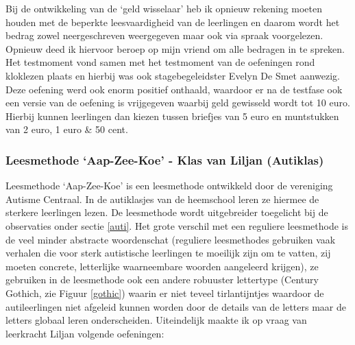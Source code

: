 \documentclass[a4paper,11pt]{article}
\theoremstyle{definition}
\begin{document}
\begin{itemize}
\begin{itemize}
\noindent Bij de ontwikkeling van de `geld wisselaar' heb ik opnieuw rekening 
moeten houden met de beperkte leesvaardigheid van de leerlingen en daarom wordt 
het bedrag zowel neergeschreven weergegeven maar ook via spraak voorgelezen. 
Opnieuw deed ik hiervoor beroep op mijn vriend om alle bedragen in te spreken. \\

\noindent Het testmoment vond samen met het testmoment van de oefeningen rond kloklezen 
plaats en hierbij was ook stagebegeleidster Evelyn De Smet aanwezig. Deze 
oefening werd ook enorm positief onthaald, waardoor er na de testfase ook een 
versie van de oefening is vrijgegeven waarbij geld gewisseld wordt tot 10 euro. 
Hierbij kunnen leerlingen dan kiezen tussen briefjes van 5 euro en muntstukken 
van 2 euro, 1 euro \& 50 cent.



\subsubsection{Leesmethode `Aap-Zee-Koe' - Klas van Liljan (Autiklas)}
Leesmethode `Aap-Zee-Koe' is een leesmethode ontwikkeld door de vereniging 
Autisme Centraal. In de autiklasjes van de heemschool leren ze hiermee de 
sterkere leerlingen lezen. De leesmethode wordt uitgebreider toegelicht bij de observaties onder sectie \ref{auti}. Het grote verschil met een reguliere leesmethode is de veel minder abstracte woordenschat (reguliere leesmethodes gebruiken vaak verhalen die voor sterk
autistische leerlingen te moeilijk zijn om te vatten, zij moeten concrete, letterlijke waarneembare woorden aangeleerd krijgen), 
ze gebruiken in de leesmethode ook een andere robuuster lettertype (Century Gothich, zie Figuur \ref{gothic}) waarin er niet teveel 
tirlantijntjes waardoor de autileerlingen niet afgeleid kunnen worden door de 
details van de letters maar de letters globaal leren onderscheiden. Uiteindelijk 
maakte ik op vraag van leerkracht Liljan volgende oefeningen:


\end{itemize}
\end{itemize}
\end{document}
